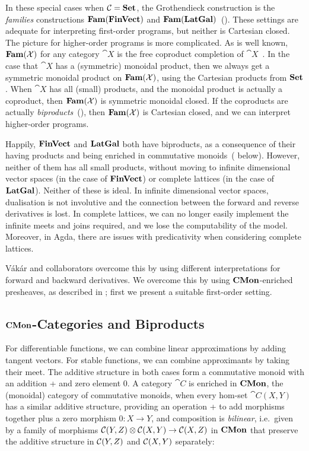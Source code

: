 In these special cases when $\mathcal{C} = \mathbf{Set}$, the Grothendieck construction is the {\em families} constructions $\mathbf{Fam}(\mathbf{FinVect})$ and $\mathbf{Fam}(\mathbf{LatGal})$~(). These settings are adequate for interpreting first-order programs, but neither is Cartesian closed. The picture for higher-order programs is more complicated. As is well known, $\mathbf{Fam}(\mathcal{X})$ for any category $\cat{X}$ is the free coproduct completion of $\cat{X}$~\cite{lawvere63}. In the case that $\cat{X}$ has a (symmetric) monoidal product, then we always get a symmetric monoidal product on $\mathbf{Fam}(\mathcal{X})$, using the Cartesian products from $\mathbf{Set}$. When $\cat{X}$ has all (small) products, and the monoidal product is actually a coproduct, then $\mathbf{Fam}(\mathcal{X})$ is symmetric monoidal closed. If the coproducts are actually {\em biproducts}~(), then $\mathbf{Fam}(\mathcal{X})$ is Cartesian closed, and we can interpret higher-order programs.

Happily, $\mathbf{FinVect}$ and $\mathbf{LatGal}$ both have biproducts, as a consequence of their having products and being enriched in commutative monoids~( below). However, neither of them has all small products, without moving to infinite dimensional vector spaces (in the case of $\mathbf{FinVect}$) or complete lattices (in the case of $\mathbf{LatGal}$). Neither of these is ideal. In infinite dimensional vector spaces, dualisation is not involutive and the connection between the forward and reverse derivatives is lost. In complete lattices, we can no longer easily implement the infinite meets and joins required, and we lose the computability of the model. Moreover, in Agda, there are issues with predicativity when considering complete lattices. 

Vákár and collaborators overcome this by using different interpretations for forward and backward derivatives. We overcome this by using $\mathbf{CMon}$-enriched presheaves, as described in ; first we present a suitable first-order setting.

\subsection{$\mathbf{CMon}$-Categories and Biproducts}
\label{sec:biproducts}

For differentiable functions, we can combine linear approximations by adding tangent vectors. For stable
functions, we can combine approximants by taking their meet. The additive structure in both cases form a
commutative monoid with an addition + and zero element 0. A category $\cat{C}$ is enriched in $\mathbf{CMon}$, the
(monoidal) category of commutative monoids, when every hom-set $\cat{C}(X,Y)$ has a similar additive
structure, providing an operation + to add morphisms together plus a zero morphism $0: X \to Y$, and
composition is \emph{bilinear}, i.e.~given by a family of morphisms ${\mathcal{C}}(Y,Z) \otimes
{\mathcal{C}}(X,Y) \to {\mathcal{C}}(X,Z)$ in $\mathbf{CMon}$ that preserve the additive structure in
${\mathcal{C}}(Y,Z)$ and ${\mathcal{C}}(X,Y)$ separately:

